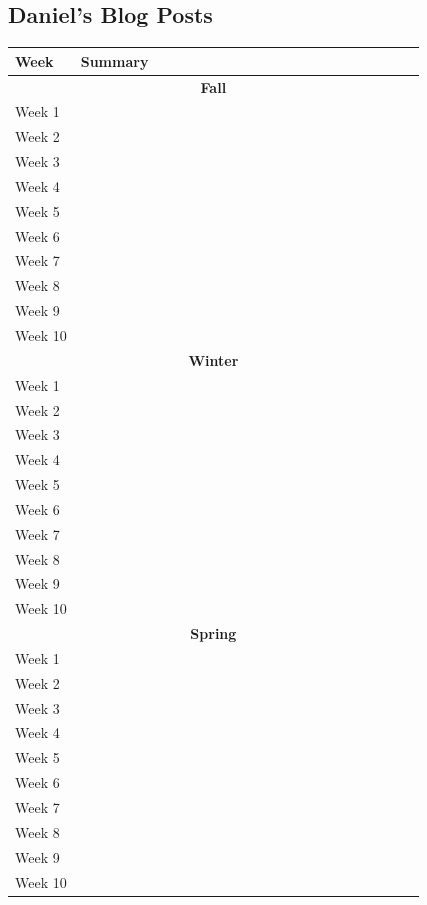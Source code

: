 \documentclass[onecolumn, draftclsnofoot,10pt, compsoc]{IEEEtran}
\begin{document}
\subsection{Daniel's Blog Posts}
\begin{center}
	\begin{longtable}{| l | p{0.84\linewidth}|}
		\hline
	Week & Summary \\ \hline
    \multicolumn{2}{c}{\textbf{Fall}} \\ \hline
    Week 1 &  \\ \hline
	Week 2 &  \\ \hline
	Week 3 &  \\ \hline
	Week 4 &  \\ \hline
    Week 5 &  \\ \hline
    Week 6 &  \\ \hline
	Week 7 &  \\ \hline
	Week 8 &  \\ \hline
	Week 9 &  \\ \hline
    Week 10 & \\ \hline
    \multicolumn{2}{c}{\textbf{Winter}} \\ \hline
    Week 1 &  \\ \hline
	Week 2 &  \\ \hline
	Week 3 &  \\ \hline
	Week 4 &  \\ \hline
    Week 5 &  \\ \hline
    Week 6 &  \\ \hline
	Week 7 &  \\ \hline
	Week 8 &  \\ \hline
	Week 9 &  \\ \hline
    Week 10 & \\ \hline
    \multicolumn{2}{c}{\textbf{Spring}} \\ \hline
    Week 1 &  \\ \hline
	Week 2 &  \\ \hline
	Week 3 &  \\ \hline
	Week 4 &  \\ \hline
    Week 5 &  \\ \hline
    Week 6 &  \\ \hline
	Week 7 &  \\ \hline
	Week 8 &  \\ \hline
	Week 9 &  \\ \hline
    Week 10 & \\ \hline
\end{longtable}
\end{center}
\end{document}
